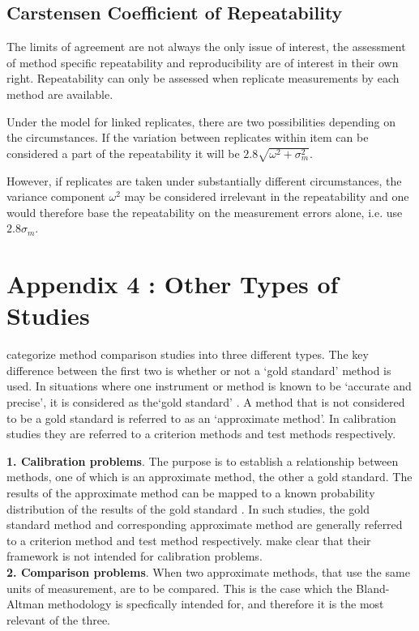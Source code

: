 \documentclass[12pt, a4paper]{report}
\theoremstyle{plain}
\theoremstyle{definition}
\theoremstyle{remark}
\begin{document}
\subsection{Carstensen Coefficient of Repeatability}
	The limits of agreement are not always the only issue of interest, the assessment of method specific repeatability and reproducibility are of interest in their own right. Repeatability can only be assessed when replicate measurements by each method are available.
	
	Under the model for linked replicates, there are two possibilities depending on the circumstances. If the variation between replicates within item can be considered a part of the repeatability it will be $2.8 \sqrt{
		\omega^2 + \sigma^2_m}$.
	
	However, if replicates are taken under substantially
	different circumstances, the variance component $\omega^2$ may be considered irrelevant in the repeatability and one would therefore
	base the repeatability on the measurement errors alone, i.e. use $2.8 \sigma_m$.
	
	\section{Appendix 4 : Other Types of Studies}
	\citet{lewis} categorize method comparison studies into three	different types.  The key difference between the first two is
	whether or not a `gold standard' method is used. In situations where one instrument or method is known to be `accurate and
	precise', it is considered as the`gold standard' \citep{lewis}. A	method that is not considered to be a gold standard is referred to
	as an `approximate method'. In calibration studies they are	referred to a criterion methods and test methods respectively.
	
\smallskip \textbf{1. Calibration problems}. The purpose is to establish a
		relationship between methods, one of which is an approximate
		method, the other a gold standard. The results of the approximate
		method can be mapped to a known probability distribution of the
		results of the gold standard \citep{lewis1991}. In such studies, the gold standard method and corresponding approximate method are
		generally referred to a criterion method and test method
		respectively. \citet*{BA83} make clear that their framework is
		not intended for calibration problems.\\
		
\smallskip \textbf{2. Comparison problems}. When two approximate methods, that use the same units of measurement, are to be
			compared. This is the case which the Bland-Altman methodology is specfically intended for, and therefore it is the most relevant of
			the three.
			
\end{document}
